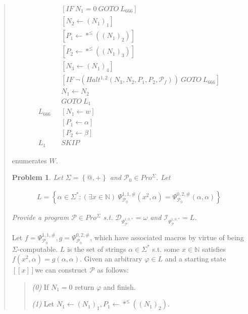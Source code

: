 \documentclass[a4paper, 12pt]{article}
\newtheorem{problem}{Problem}
\newtheorem{problem}{Problem}
\begin{document}
\begin{quote}
\begin{align*}
    &[IF ~ N_1 = 0 ~ GOTO ~ L_{666}]\\
    &[N_2 \leftarrow (N_1)_1] \\
    &[P_1 \leftarrow *^{\leq}\left( (N_1)_2 \right) ] \\
    &[P_2 \leftarrow *^{\leq}\left( (N_1)_3 \right) ] \\
    &[N_3 \leftarrow (N_1)_4] \\
    &[IF ~ \neg \left(Halt^{1, 2}(N_3, N_2, P_1, P_2, \mathcal{P}_f)\right) ~
    GOTO ~ L_{666}] \\ 
    &N_1 \leftarrow N_2 \\ 
    &GOTO ~ L_1 \\ 
    L_{666} ~ ~ ~ &[N_1 \leftarrow  w] \\ 
                  &[P_1 \leftarrow \alpha] \\ 
    &[ P_2 \leftarrow \beta ] \\ 
    L_1 ~ ~ ~ &SKIP
\end{align*}

enumerates $W$.

\begin{problem}
    Let $\Sigma = \left\{ @, + \right\} $ and $\mathcal{P}_0 \in  Pro^{\Sigma}$.
    Let 

    \begin{align*}
        L = \left\{ \alpha \in \Sigma^{*} : (\exists x \in \mathbb{N})
        ~ \Psi_{\mathcal{P}_0}^{1, 1, \#}(x^2, \alpha) = \Psi_{\mathcal{P}_0}^{0,
    2, \#}(\alpha, \alpha) \right\} 
    \end{align*}

    Provide a program $\mathcal{P} \in Pro^{\Sigma}$ s.t.
    $\mathcal{D}_{\Psi_{\mathcal{P}}^{1, 0, *}} = \omega$ and
    $\mathcal{I}_{\Psi_{\mathcal{P}}^{1, 0, *}} = L$.
\end{problem}

Let $f = \Psi_{\mathcal{P}_0}^{1, 1, \#}, g = \Psi_{\mathcal{P}_0}^{0, 2, \#}$,
which have associated macros by virtue of being $\Sigma$-computable. $L$ is the
set of strings $\alpha \in \Sigma^{*}$ s.t. some $x \in \mathbb{N}$ satisfies
$f(x^2, \alpha) = g(\alpha, \alpha)$. Given an arbitrary $\varphi \in L$ and a
starting state $[\![ x ]\!]$we can construct $\mathcal{P}$ as follows:

\begin{quote}
    \textit{(0)} If $N_1 = 0$ return $\varphi$ and finish.

    \textit{(1)} Let $N_1 \leftarrow (N_1)_1, P_1 \leftarrow *^{\leq}\left( (N_1)_2 \right) $. 


\end{quote}
\end{quote}
\end{document}
